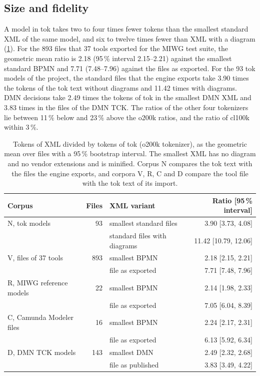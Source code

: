 \documentclass[11pt,a4paper]{article}
\begin{document}
\subsection{Size and fidelity}

A model in tok takes two to four times fewer tokens than the smallest standard XML of the same model, and six to twelve times fewer than XML with a diagram (\cref{tab:size}). For the 893 files that 37 tools exported for the MIWG test suite, the geometric mean ratio is 2.18 (95\,\% interval 2.15--2.21) against the smallest standard BPMN and 7.71 (7.48--7.96) against the files as exported. For the 93 tok models of the project, the standard files that the engine exports take 3.90 times the tokens of the tok text without diagrams and 11.42 times with diagrams. DMN decisions take 2.49 times the tokens of tok in the smallest DMN XML and 3.83 times in the files of the DMN TCK. The ratios of the other four tokenizers lie between 11\,\% below and 23\,\% above the o200k ratios, and the ratio of cl100k within 3\,\%.

\begin{table}[t]
\centering
\small
\caption{Tokens of XML divided by tokens of tok (o200k tokenizer), as the geometric mean over files with a 95\,\% bootstrap interval. The smallest XML has no diagram and no vendor extensions and is minified. Corpus N compares the tok text with the files the engine exports, and corpora V, R, C and D compare the tool file with the tok text of its import.}\label{tab:size}
\begin{tabular}{@{}l r l r@{}}
\toprule
Corpus & Files & XML variant & Ratio [95\,\% interval]\\
\midrule
N, tok models & 93 & smallest standard files & 3.90 [3.73, 4.08]\\
 & & standard files with diagrams & 11.42 [10.79, 12.06]\\
V, files of 37 tools & 893 & smallest BPMN & 2.18 [2.15, 2.21]\\
 & & file as exported & 7.71 [7.48, 7.96]\\
R, MIWG reference models & 22 & smallest BPMN & 2.14 [1.98, 2.33]\\
 & & file as exported & 7.05 [6.04, 8.39]\\
C, Camunda Modeler files & 16 & smallest BPMN & 2.24 [2.17, 2.31]\\
 & & file as exported & 6.13 [5.92, 6.34]\\
D, DMN TCK models & 143 & smallest DMN & 2.49 [2.32, 2.68]\\
 & & file as published & 3.83 [3.49, 4.22]\\
\bottomrule
\end{tabular}
\end{table}
\end{document}

